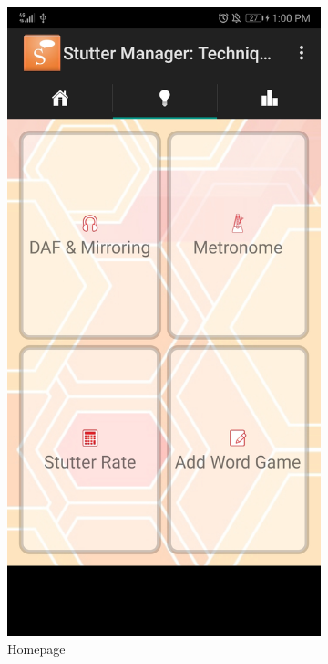 \begin{appendices}
\begin{landscape}
\begin{figure}[h]
  \centering
  \begin{subfigure}{.25\textwidth}
    \centering
    \includegraphics[width=.75\linewidth]{content/imgs/old_app_1.jpg}
    \caption{Homepage}
  \end{subfigure}%
  \begin{subfigure}{.25\textwidth}
    \centering

\end{subfigure}
\end{figure}
\end{landscape}
\end{appendices}
